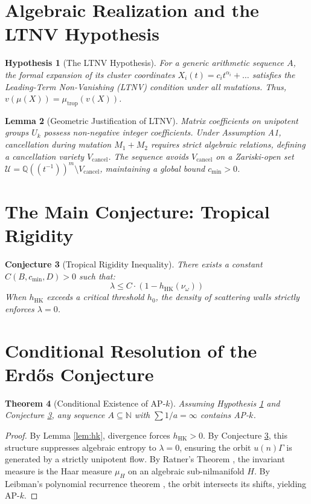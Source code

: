 \documentclass[11pt, a4paper, reqno]{amsart}
\newtheorem{theorem}{Theorem}[section]
\newtheorem{lemma}[theorem]{Lemma}
\newtheorem{conjecture}[theorem]{Conjecture}
\newtheorem{hypothesis}[theorem]{Hypothesis}
\theoremstyle{definition}
\newcommand{\N}{\mathbb{N}}
\newcommand{\K}{\mathbb{Q}((t^{-1}))}
\newcommand{\hHK}{h_{\mathrm{HK}}}
\newcommand{\mutrop}{\mu_{\mathrm{trop}}}
\newcommand{\Vcancel}{V_{\mathrm{cancel}}}
\begin{document}
\section{Algebraic Realization and the LTNV Hypothesis}

\begin{hypothesis}[The LTNV Hypothesis] \label{hyp:ltnv}
For a generic arithmetic sequence $A$, the formal expansion of its cluster coordinates $X_i(t) = c_i t^{\alpha_i} + \dots$ satisfies the Leading-Term Non-Vanishing (LTNV) condition under all mutations. Thus, $v(\mu(X)) = \mutrop(v(X))$.
\end{hypothesis}

\begin{lemma}[Geometric Justification of LTNV] \label{lem:ltnv_geom}
Matrix coefficients on unipotent groups $U_k$ possess non-negative integer coefficients. Under Assumption A1, cancellation during mutation $M_1 + M_2$ requires strict algebraic relations, defining a cancellation variety $\Vcancel$. The sequence avoids $\Vcancel$ on a Zariski-open set $\mathcal{U} = \K^m \setminus \Vcancel$, maintaining a global bound $c_{\min} > 0$.
\end{lemma}

\section{The Main Conjecture: Tropical Rigidity}

\begin{conjecture}[Tropical Rigidity Inequality] \label{conj:rigidity}
There exists a constant $C(B, c_{\min}, D) > 0$ such that:
$$\lambda \leq C \cdot (1 - \hHK(\nu_\omega))$$
When $\hHK$ exceeds a critical threshold $h_0$, the density of scattering walls strictly enforces $\lambda = 0$.
\end{conjecture}

\section{Conditional Resolution of the Erd\H{o}s Conjecture}

\begin{theorem}[Conditional Existence of AP-$k$] \label{thm:main}
Assuming Hypothesis \ref{hyp:ltnv} and Conjecture \ref{conj:rigidity}, any sequence $A \subseteq \N$ with $\sum 1/a = \infty$ contains AP-$k$.
\end{theorem}
\begin{proof}
By Lemma \ref{lem:hk}, divergence forces $\hHK > 0$. By Conjecture \ref{conj:rigidity}, this structure suppresses algebraic entropy to $\lambda = 0$, ensuring the orbit $u(n)\Gamma$ is generated by a strictly unipotent flow. By Ratner's Theorem \cite[Theorem 1]{Ratner1991}, the invariant measure is the Haar measure $\mu_H$ on an algebraic sub-nilmanifold $H$. By Leibman's polynomial recurrence theorem \cite{Leibman2005}, the orbit intersects its shifts, yielding AP-$k$.
\end{proof}
\end{document}
